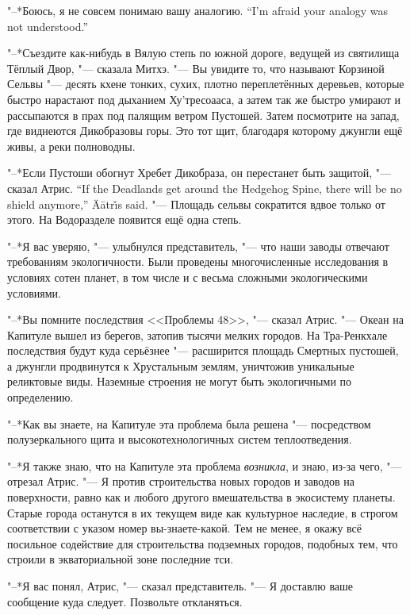 {"--*Боюсь, я не совсем понимаю вашу аналогию.}
{``I'm afraid your analogy was not understood.''}

"--*Съездите как-нибудь в Вялую степь по южной дороге, ведущей из святилища Тёплый Двор, "--- сказала Митхэ.
"--- Вы увидите то, что называют Корзиной Сельвы "--- десять кхене тонких, сухих, плотно переплетённых деревьев, которые быстро нарастают под дыханием Ху'тресоааса, а затем так же быстро умирают и рассыпаются в прах под палящим ветром Пустошей.
Затем посмотрите на запад, где виднеются Дикобразовы горы.
Это тот щит, благодаря которому джунгли ещё живы, а реки полноводны.

{"--*Если Пустоши обогнут Хребет Дикобраза, он перестанет быть защитой, "--- сказал Атрис.}
{``If the Deadlands get around the Hedgehog Spine, there will be no shield anymore,'' \"{A}\={a}tr\v{\i}s said.}
"--- Площадь сельвы сократится вдвое только от этого.
На Водоразделе появится ещё одна степь.

"--*Я вас уверяю, "--- улыбнулся представитель, "--- что наши заводы отвечают требованиям экологичности.
Были проведены многочисленные исследования в условиях сотен планет, в том числе и с весьма сложными экологическими условиями.

"--*Вы помните последствия <<Проблемы 48>>, "--- сказал Атрис.
"--- Океан на Капитуле вышел из берегов, затопив тысячи мелких городов.
На Тра-Ренкхале последствия будут куда серьёзнее "--- расширится площадь Смертных пустошей, а джунгли продвинутся к Хрустальным землям, уничтожив уникальные реликтовые виды.
Наземные строения не могут быть экологичными по определению.

"--*Как вы знаете, на Капитуле эта проблема была решена "--- посредством полузеркального щита и высокотехнологичных систем теплоотведения.

"--*Я также знаю, что на Капитуле эта проблема \emph{возникла}, и знаю, из-за чего, "--- отрезал Атрис.
"--- Я против строительства новых городов и заводов на поверхности, равно как и любого другого вмешательства в экосистему планеты.
Старые города останутся в их текущем виде как культурное наследие, в строгом соответствии с указом номер вы-знаете-какой.
Тем не менее, я окажу всё посильное содействие для строительства подземных городов, подобных тем, что строили в экваториальной зоне последние тси.

"--*Я вас понял, Атрис, "--- сказал представитель.
"--- Я доставлю ваше сообщение куда следует.
Позвольте откланяться.

